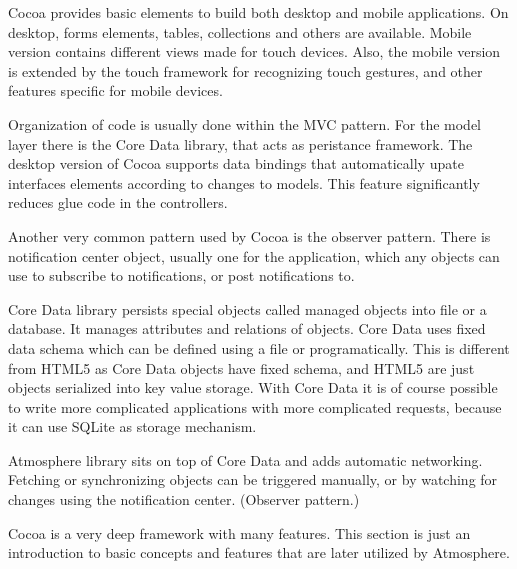 Cocoa provides basic elements to build both desktop and mobile applications. On desktop, forms elements, tables, collections and others are available. Mobile version contains different views made for touch devices. Also, the mobile version is extended by the touch framework for recognizing touch gestures, and other features specific for mobile devices.

Organization of code is usually done within the MVC pattern. For the model layer there is the Core Data library, that acts as peristance framework. The desktop version of Cocoa supports data bindings that automatically upate interfaces elements according to changes to models. This feature significantly reduces glue code in the controllers.

Another  very common pattern used by Cocoa is the observer pattern. There is notification center object, usually one for the application, which any objects can use to subscribe to notifications, or post notifications to. 

Core Data library persists special objects called managed objects into file or a database.  It manages attributes and relations of objects. Core Data uses fixed data schema which can be defined using a file or programatically. This is different from HTML5 as Core Data objects have fixed schema, and HTML5 are just objects serialized into key value storage. With Core Data it is of course possible to write more complicated applications with more complicated requests, because it can use SQLite as storage mechanism.

Atmosphere library sits on top of Core Data and adds automatic networking. Fetching or synchronizing objects can be triggered manually, or by watching  for changes using the notification center. (Observer pattern.)

Cocoa is a very deep framework with many features. This section is just an introduction to basic concepts and features that are later utilized by Atmosphere. 
